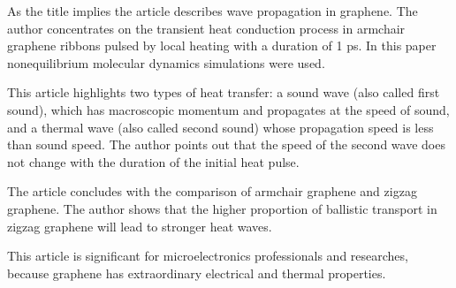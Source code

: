 \documentclass[main.tex]{subfiles}
\begin{document}
\setcounter{subsection}{3}
As the title implies the article describes wave propagation in graphene.
The author concentrates on the transient heat conduction process in armchair graphene ribbons pulsed by local heating with a duration of 1 ps.
In this paper nonequilibrium molecular dynamics simulations were used.\par
This article highlights two types of heat transfer: a sound wave (also called first sound), which has macroscopic momentum and propagates at the speed of sound, and a thermal wave (also called second sound) whose propagation speed is less than sound speed.
The author points out that the speed of the second wave does not change with the duration of the initial heat pulse.\par
The article concludes with the comparison of armchair graphene and zigzag graphene. The author shows that the higher proportion of ballistic transport in zigzag graphene will lead to stronger heat waves.\par
This article is significant for microelectronics professionals and researches, because graphene has extraordinary electrical and thermal properties.
\ \\\\
\newpage


\setcounter{subsection}{4}

\ \\\\
\newpage


\setcounter{subsection}{5}

\ \\\\
\newpage


\setcounter{subsection}{6}

\ \\\\
\newpage


\setcounter{subsection}{7}

\ \\\\
\newpage
\end{document}
